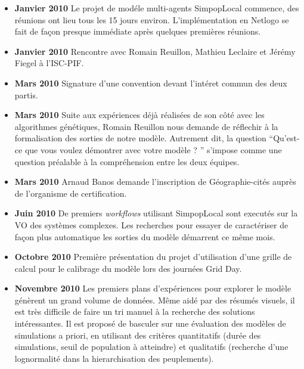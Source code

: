\begin{itemize}[label=\textbullet]

\item {\textbf{Janvier 2010}} Le projet de modéle multi-agents SimpopLocal commence, des réunions ont lieu tous les 15 jours environ. L'implémentation en Netlogo se fait de façon presque immédiate après quelques premières réunions.

\item {\textbf{Janvier 2010}} Rencontre avec Romain Reuillon, Mathieu Leclaire et Jérémy Fiegel à l'ISC-PIF.

\item {\textbf{Mars 2010}} Signature d'une convention devant l'intéret commun des deux partis.

\item {\textbf{Mars 2010}} Suite aux expériences déjà réalisées de son côté avec les algorithmes génétiques, Romain Reuillon nous demande de réflechir à la formalisation des sorties de notre modèle. Autrement dit, la question \enquote{Qu'est-ce que vous voulez démontrer avec votre modèle ? } s'impose comme une question préalable à la compréhension entre les deux équipes.

\item {\textbf{Mars 2010}} Arnaud Banos demande l'inscription de Géographie-cités auprès de l'organisme de certification.

\item {\textbf{Juin 2010}} De premiers \textit{workflows} utilisant SimpopLocal sont executés sur la VO des systèmes complexes. Les recherches pour essayer de caractériser de façon plus automatique les sorties du modèle démarrent ce même mois.

\item {\textbf{Octobre 2010}} Première présentation du projet d'utilisation d'une grille de calcul pour le calibrage du modèle lors des journées Grid Day.

\item {\textbf{Novembre 2010}} Les premiers plans d'expériences pour explorer le modèle génèrent un grand volume de données. Même aidé par des résumés visuels, il est très difficile de faire un tri manuel à la recherche des solutions intéressantes. Il est proposé de basculer sur une évaluation des modèles de simulations a priori, en utilisant des critères quantitatifs (durée des simulations, seuil de population à atteindre) et qualitatifs (recherche d'une lognormalité dans la hierarchisation des peuplements).


\end{itemize}
